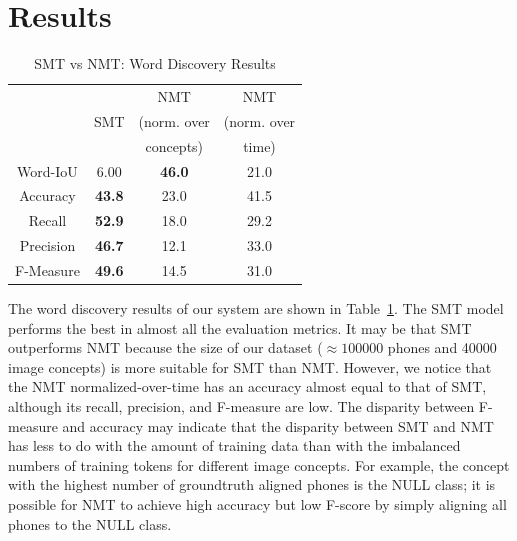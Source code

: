 \documentclass[a4paper]{article}
\begin{document}
\section{Results}

\begin{table}[th]
    \centering
    \caption{SMT vs NMT: Word Discovery Results}
    \begin{tabular}{|c|c|c|c|}
    \hline
        & \multirow{3}{*}{SMT} & NMT  & NMT\\
        & & (norm. over & (norm. over \\
        & & concepts) 	& time)\\
    \hline
    Word-IoU & 6.00 & \textbf{46.0} & 21.0 \\
    Accuracy & \textbf{43.8} & 23.0 & 41.5 \\
    Recall   & \textbf{52.9} & 18.0 & 29.2 \\
    Precision & \textbf{46.7} & 12.1 & 33.0 \\
    F-Measure & \textbf{49.6} & 14.5 & 31.0\\
    \hline
    \end{tabular}
    \label{tab:word_discovery_res}
\end{table}

The word discovery results of our system are shown in Table~\ref{tab:word_discovery_res}.
The SMT model performs the best in almost all the evaluation metrics.
It may be that SMT outperforms NMT
because the size of our dataset ($\approx 100000$ phones and 40000 image concepts) is more suitable for SMT than NMT.
However, we notice that the NMT normalized-over-time has an accuracy
almost equal to that of SMT,
although its recall, precision, and F-measure are low.
The disparity between F-measure and accuracy may indicate that the
disparity between SMT and NMT has less to do with the amount of training data than
with 
the imbalanced numbers of training tokens for different image concepts.
For example, the concept with the highest number of groundtruth aligned phones is the
NULL class; it is possible for NMT to achieve high accuracy but low F-score
by simply aligning all phones to the NULL class.
\end{document}
